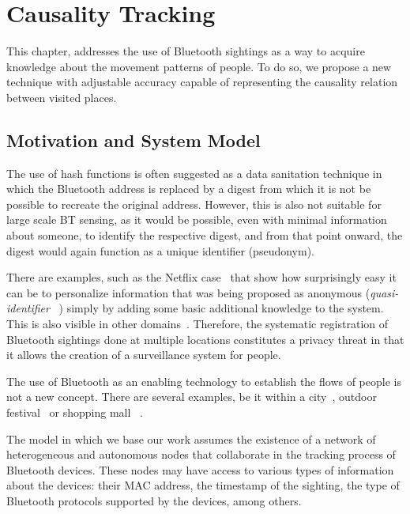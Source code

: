 \chapter{Causality Tracking}
\label{cha:causality-tracking}
This chapter, addresses the use of Bluetooth sightings as a way to
acquire knowledge about the movement patterns of people. To do so, we
propose a new technique with adjustable accuracy capable of
representing the causality relation between visited places. 

\section{Motivation and System Model}
\label{sec:ct-motivation}

The use of hash functions is often suggested as a data sanitation
technique in which the Bluetooth address is replaced by a digest from
which it is not be possible to recreate the original address. However,
this is also not suitable for large scale BT sensing, as it would be
possible, even with minimal information about someone, to identify the
respective digest, and from that point onward, the digest would again
function as a unique identifier (pseudonym).

There are examples, such as the Netflix
case~\cite{DBLP:journals/corr/abs-cs-0610105} that show how
surprisingly easy it can be to personalize information that was being
proposed as anonymous (\emph{quasi-identifier}
~\cite{bettini2005protecting}) simply by adding some basic additional
knowledge to the system. This is also visible in other
domains~\cite{Ohm:2010tc}. Therefore, the systematic registration of
Bluetooth sightings done at multiple locations constitutes a privacy
threat in that it allows the creation of a surveillance system for
people.

The use of Bluetooth as an enabling technology to establish the flows
of people is not a new concept. There are several examples, be it
within a city~\cite{Oneill:2006vq}, outdoor
festival~\cite{versichele2012use} or shopping mall
~\cite{millonig2008shadowing}.

The model in which we base our work assumes the existence of a network
of heterogeneous and autonomous nodes that collaborate in the
tracking process of Bluetooth devices. These nodes may have access to
various types of information about the devices: their MAC address, the
timestamp of the sighting, the type of Bluetooth protocols supported
by the devices, among others. 

